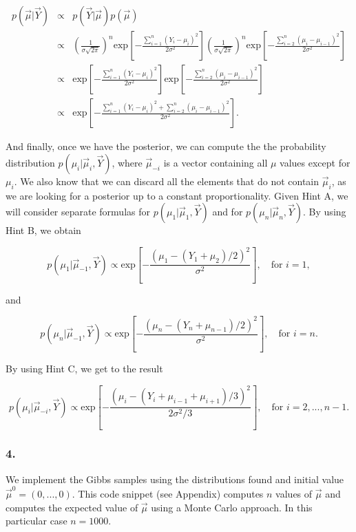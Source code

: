 \documentclass[]{article}
\begin{document}
\begin{eqnarray*}
p(\vec{\mu}|\vec{Y}) &\propto& p(\vec{Y}|\vec{\mu})p(\vec{\mu})\\
                     &\propto& \left(\frac{1}{\sigma\sqrt{2\pi}}\right)^n \text{exp}\left[-\frac{\sum_{i=1}^{n}(Y_{i}-\mu_{i})^2}{2\sigma^{2}}\right] \left(\frac{1}{\sigma\sqrt{2\pi}}\right)^n \text{exp}\left[-\frac{\sum_{i=2}^{n}(\mu_{i}-\mu_{i-1})^2}{2\sigma^{2}}\right]\\
                     &\propto& \text{exp}\left[-\frac{\sum_{i=1}^{n}(Y_{i}-\mu_{i})^2}{2\sigma^{2}}\right] \text{exp}\left[-\frac{\sum_{i=2}^{n}(\mu_{i}-\mu_{i-1})^2}{2\sigma^{2}}\right]\\
                     &\propto& \text{exp}\left[-\frac{\sum_{i=1}^{n}(Y_{i}-\mu_{i})^2 + \sum_{i=2}^{n}(\mu_{i}-\mu_{i-1})^2}{2\sigma^{2}}\right].
\end{eqnarray*}

And finally, once we have the posterior, we can compute the the
probability distribution \(p(\mu_{i}|\vec{\mu}_{i},\vec{Y})\), where
\(\vec\mu_{-i}\) is a vector containing all \(\mu\) values except for
\(\mu_{i}\). We also know that we can discard all the elements that do
not contain \(\vec\mu_{i}\), as we are looking for a posterior up to a
constant proportionality. Given Hint A, we will consider separate
formulas for \(p(\mu_{1}|\vec{\mu}_{1},\vec{Y})\) and for
\(p(\mu_{n}|\vec{\mu}_{n},\vec{Y})\). By using Hint B, we obtain

\[p(\mu_{1}|\vec{\mu}_{-1},\vec{Y}) \propto \text{exp}\left[-\frac{\left(\mu_{1}-(Y_{1}+\mu_{2})/2\right)^{2}}{\sigma^{2}}\right], \quad \text{for }i=1,\]

and

\[p(\mu_{n}|\vec{\mu}_{-1},\vec{Y}) \propto \text{exp}\left[-\frac{\left(\mu_{n}-(Y_{n}+\mu_{n-1})/2\right)^{2}}{\sigma^{2}}\right], \quad \text{for }i=n.\]

By using Hint C, we get to the result

\[p(\mu_{i}|\vec{\mu}_{-i},\vec{Y}) \propto \text{exp}\left[-\frac{\left(\mu_{i}-(Y_{i}+\mu_{i-1}+\mu_{i+1})/3\right)^{2}}{2\sigma^{2}/3}\right], \quad \text{for } i=2,...,n-1.\]

\hypertarget{section-9}{%
\subsubsection{4.}\label{section-9}}

We implement the Gibbs samples using the distributions found and initial
value \(\vec\mu^{0}=(0,...,0)\). This code snippet (see Appendix)
computes \(n\) values of \(\vec\mu\) and computes the expected value of
\(\vec\mu\) using a Monte Carlo approach. In this particular case
\(n=1000\).
\end{document}
